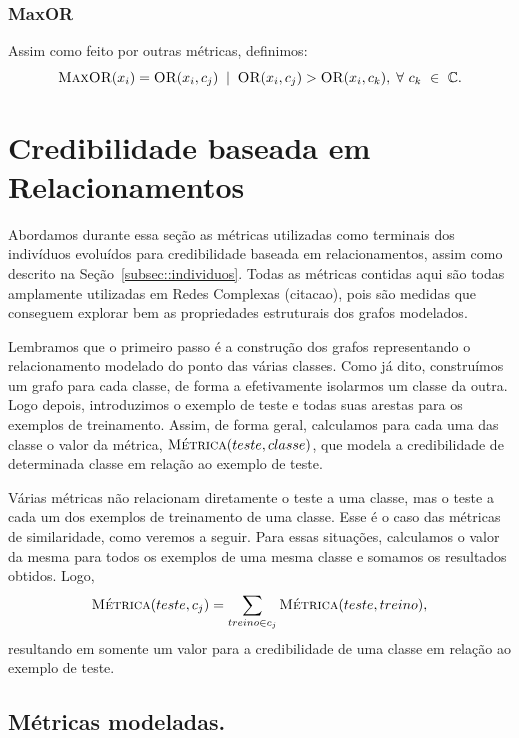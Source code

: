 \subsubsection{MaxOR}
\label{subsubsection::maxor}
Assim como feito por outras métricas, definimos:
\begin{equation}\label{eqn::maxor}
\textsc{MaxOR}(x_i) = \textsc{OR}(x_i,c_j) \; \; | \;\; \textsc{OR}(x_i, c_j) > \textsc{OR}(x_i, c_k), \; \forall\ c_k\ \in\ \mathbb{C}.
\end{equation}


\section{Credibilidade baseada em Relacionamentos}
\label{sec::pg_cred_baseada_grafos}

Abordamos durante essa seção as métricas utilizadas como terminais dos indivíduos evoluídos para credibilidade baseada em relacionamentos, assim como descrito na Seção~\ref{subsec::individuos}. Todas as métricas contidas aqui são todas amplamente utilizadas em Redes Complexas (citacao), pois são medidas que conseguem explorar bem as propriedades estruturais dos grafos modelados.

Lembramos que o primeiro passo é a construção dos grafos representando o relacionamento modelado do ponto das várias classes. 
Como já dito, construímos um grafo para cada classe, de forma a efetivamente isolarmos um classe da outra.
Logo depois, introduzimos o exemplo de teste e todas suas arestas para os exemplos de treinamento. Assim, de forma geral, calculamos para cada uma das classe o valor da métrica, $\textsc{Métrica}(teste, classe)$, que modela a credibilidade de determinada classe em relação ao exemplo de teste. 

Várias métricas não relacionam diretamente o teste a uma classe, mas o teste a cada um dos exemplos de treinamento de uma classe. Esse é o caso das métricas de similaridade, como veremos a seguir. Para essas situações, calculamos o valor da mesma para todos os exemplos de uma mesma classe e somamos os resultados obtidos. Logo,
\begin{equation}
         \textsc{Métrica}(teste, c_j) =  \sum\limits_{treino \in c_j} \textsc{Métrica}(teste, treino),
\end{equation}
resultando em somente um valor para a credibilidade de uma classe em relação ao exemplo de teste.

\subsection{Métricas modeladas.}
\label{subsec::pg_metricas_grafos}

